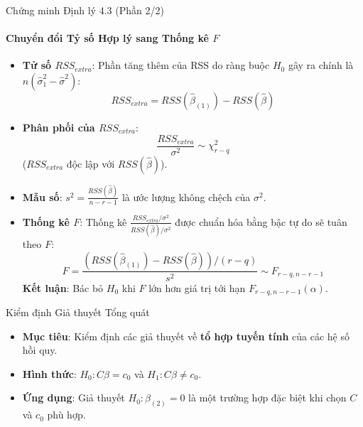 \begin{frame}{Chứng minh Định lý 4.3 (Phần 2/2)}
    \framesubtitle{Chuyển đổi Tỷ số Hợp lý sang Thống kê $F$}

    \begin{itemize}
        \item \textbf{Tử số $RSS_{extra}$}: Phần tăng thêm của RSS do ràng buộc $H_0$ gây ra chính là $n(\hat{\sigma}_1^2 - \hat{\sigma}^2)$:
        \[
            RSS_{extra} = RSS(\hat{\beta}_{(1)}) - RSS(\hat{\beta})
        \]

        \item \textbf{Phân phối của $RSS_{extra}$}:
           \[
            \frac{RSS_{extra}}{\sigma^2} \sim \chi^2_{r-q}
           \]
        ($RSS_{extra}$ độc lập với $RSS(\hat{\beta})$).
        \item \textbf{Mẫu số}: $s^2 = \frac{RSS(\hat{\beta})}{n-r-1}$ là ước lượng không chệch của $\sigma^2$.
        \item \textbf{Thống kê $F$}: Thống kê $\frac{RSS_{extra}/\sigma^2}{RSS(\hat{\beta})/\sigma^2}$ được chuẩn hóa bằng bậc tự do sẽ tuân theo $F$:
        \[
            F = \frac{(RSS(\hat{\beta}_{(1)})-RSS(\hat{\beta}))/(r-q)}{s^{2}} \sim F_{r-q,n-r-1}
        \]
        \textbf{Kết luận}: Bác bỏ $H_0$ khi $F$ lớn hơn giá trị tới hạn $F_{r-q,n-r-1}(\alpha)$.
    \end{itemize}
\end{frame}

\begin{frame}{Kiểm định Giả thuyết Tổng quát}

    \begin{itemize}
        \item \textbf{Mục tiêu}: Kiểm định các giả thuyết về \textbf{tổ hợp tuyến tính} của các hệ số hồi quy.
        \item \textbf{Hình thức}: $H_{0}:C\beta=c_{0}$ và $H_{1}:C\beta\ne c_{0}$.
        \item \textbf{Ứng dụng}: Giả thuyết $H_0: \beta_{(2)}=0$ là một trường hợp đặc biệt khi chọn $C$ và $c_0$ phù hợp.
    \end{itemize}
\end{frame}


